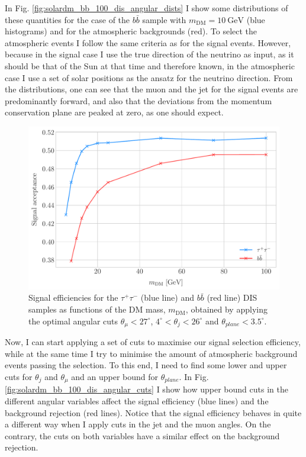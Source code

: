 In Fig. \ref{fig:solardm_bb_100_dis_angular_dists} I show some distributions of these quantities for the case of the $b\bar{b}$ sample with $m_{\mathrm{DM}} = 10 \ \mathrm{GeV}$ (blue histograms) and for the atmospheric backgrounds (red). To select the atmospheric events I follow the same criteria as for the signal events. However, because in the signal case I use the true direction of the neutrino as input, as it should be that of the Sun at that time and therefore known, in the atmospheric case I use a set of solar positions as the ansatz for the neutrino direction. From the distributions, one can see that the muon and the jet for the signal events are predominantly forward, and also that the deviations from the momentum conservation plane are peaked at zero, as one should expect.

\begin{figure}[t]
	\centering
	\includegraphics[width=0.9\linewidth]{Images/DM_Analysis/solardm_dis_signal_acceptance.pdf}
	\caption[Signal efficiencies for the $\tau^{+} \tau^{-}$ and $b\bar{b}$ DIS samples as functions of the DM mass.]{Signal efficiencies for the $\tau^{+} \tau^{-}$ (blue line) and $b\bar{b}$ (red line) DIS samples as functions of the DM mass, $m_{\mathrm{DM}}$, obtained by applying the optimal angular cuts $\theta_{\mu} < 27^{\circ}$, $4^{\circ} < \theta_{j} < 26^{\circ}$ and $\theta_{plane} < 3.5^{\circ}$.}
	\label{fig:solardm_dis_efficiency}
\end{figure}

Now, I can start applying a set of cuts to maximise our signal selection efficiency, while at the same time I try to minimise the amount of atmospheric background events passing the selection. To this end, I need to find some lower and upper cuts for $\theta_{j}$ and $\theta_{\mu}$ and an upper bound for $\theta_{plane}$. In Fig. \ref{fig:solardm_bb_100_dis_angular_cuts} I show how upper bound cuts in the different angular variables affect the signal efficiency (blue lines) and the background rejection (red lines). Notice that the signal efficiency behaves in quite a different way when I apply cuts in the jet and the muon angles. On the contrary, the cuts on both variables have a similar effect on the background rejection.

